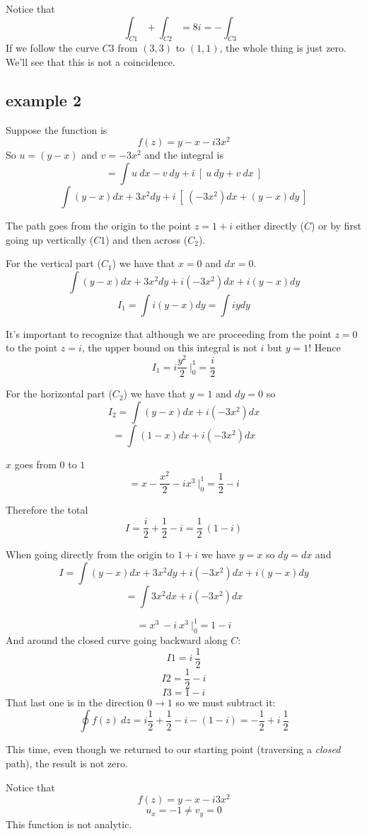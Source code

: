 \documentclass[11pt, oneside]{article}
\begin{document}
Notice that 
\[ \int_{C1} + \int_{C2} = 8i  = - \int_{C3}\]
If we follow the curve $C3$ from $(3,3)$ to $(1,1)$, the whole thing is just zero.  We'll see that this is not a coincidence.

\subsection*{example 2}
Suppose the function is
\[ f(z) = y - x - i3x^2 \]
So $u = (y-x)$ and $v = -3x^2$ and the integral is
\[ = \int u \ dx - v \ dy + i \ [ \ u \ dy + v \ dx \ ] \]
\[ \int (y - x) dx + 3x^2 dy + i \ [ \ (-3x^2) dx + (y-x) dy \ ]  \]

The path goes from the origin to the point $z = 1 + i$ either directly ($C$) or by first going up vertically ($C1$) and then across ($C_2$).

For the vertical part ($C_1$) we have that $x = 0$ and $dx = 0$.
\[ \int (y - x) dx + 3x^2 dy + i (-3x^2) dx + i (y-x) dy \]
\[ I_1 = \int i (y-x) dy = \int i y dy \]

It's important to recognize that although we are proceeding from the point $z=0$ to the point $z = i$, the upper bound on this integral is not $i$ but $y = 1$!  Hence
\[ I_1 = i\frac{y^2}{2} \ \bigg |_0^1 = \frac{i}{2} \]

For the horizontal part ($C_2$) we have that $y=1$ and $dy = 0$ so
\[ I_2 = \int (y - x) dx + i (-3x^2) dx  \]
\[ = \int (1 - x) dx + i (-3x^2) dx \]

$x$ goes from $0$ to $1$
\[ = x - \frac{x^2}{2} - ix^3 \ \bigg |_0^1 = \frac{1}{2} - i \]

Therefore the total
\[ I = \frac{i}{2} + \frac{1}{2} - i = \frac{1}{2} \ (1 - i) \]

When going directly from the origin to $1 + i$ we have $y = x$ so $dy = dx$ and
\[ I = \int (y - x) dx + 3x^2 dy + i (-3x^2) dx + i (y-x) dy \]
\[ = \int 3x^2 dx + i (-3x^2) dx  \]

\[ =  x^3 \  -i  \ x^3 \ \bigg |_0^1  = 1  - i \]
And around the closed curve going backward along $C$:
\[ I1 = i \ \frac{1}{2} \]
\[ I2 = \frac{1}{2} - i \]
\[ I3 = 1 - i \]
That last one is in the direction $0 \rightarrow 1$ so we must subtract it:
\[ \oint f(z) \ dz = i \frac{1}{2} + \frac{1}{2} - i - (1  - i) =  -\frac{1}{2} + i \ \frac{1}{2} \]

This time, even though we returned to our starting point (traversing a \emph{closed} path), the result is not zero.

Notice that
\[ f(z) = y - x - i3x^2 \]
\[ u_x = -1 \ne v_y = 0 \]
This function is not analytic.
\end{document}
